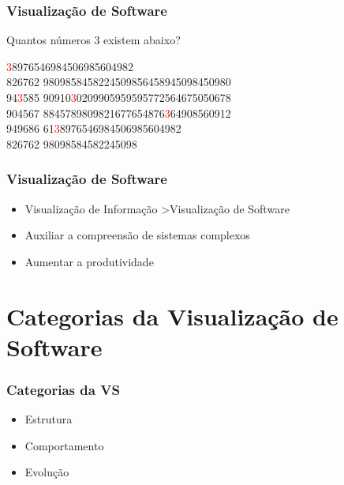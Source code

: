 \documentclass{beamer}
\begin{document}

\begin{frame}
\frametitle{Visualização de Software}
\center Quantos números 3 existem abaixo?

\textcolor{red}{3}8976546984506985604982 \\
826762 9809858458224509856458945098450980 \\
94\textcolor{red}{3}585 90910\textcolor{red}{3}0209905959595772564675050678 \\
904567 8845789809821677654876\textcolor{red}{3}64908560912 \\
949686 61\textcolor{red}{3}8976546984506985604982 \\
826762 98098584582245098 \\

\end{frame}


\begin{frame}
\frametitle{Visualização de Software}
\begin{itemize}
\item Visualização de Informação \textgreater Visualização de Software
\item Auxiliar a compreensão de sistemas complexos
\item Aumentar a produtividade
\end{itemize}

\end{frame}

\section{Categorias da Visualização de Software} %

\begin{frame}
\frametitle{Categorias da VS}
\begin{itemize}
\item Estrutura
\item Comportamento
\item Evolução
\end{itemize}

\end{frame}
\end{document}

